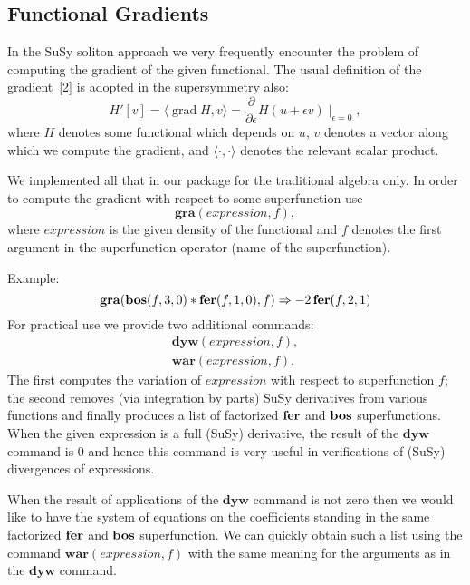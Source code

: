 {\subsection{Functional Gradients}

In the SuSy soliton approach we very frequently encounter the problem
of computing the gradient of the given functional.  The usual
definition of the gradient~\hyperref[susy2-bib]{[2]} is adopted in the
supersymmetry also:
\begin{equation*}
  H'[v] = \langle \operatorname{grad} H, v \rangle =
  \frac{\partial}{\partial\epsilon} H(u+\epsilon v) \mid_{\epsilon=0},
\end{equation*}
where $H$ denotes some functional which depends on $u$, $v$ denotes a
vector along which we compute the gradient, and
$\langle\cdot,\cdot\rangle$ denotes the relevant scalar product.

We implemented all that in our package for the traditional algebra
only.  In order to compute the gradient with respect to some
superfunction use
\begin{equation*}
  \mathbf{gra}(\mathit{expression},f),
\end{equation*}
where $\mathit{expression}$ is the given density of the functional and
$f$ denotes the first argument in the superfunction operator (name of
the superfunction).

Example:
\begin{equation*}
  \mathbf{gra}(\mathbf{bos}(f,3,0)*\mathbf{fer}(f,1,0),f) \Rightarrow -2\,\mathbf{fer}(f,2,1)
\end{equation*}
For practical use we provide two additional commands:
\begin{gather*}
  \mathbf{dyw}(\mathit{expression},f), \\
  \mathbf{war}(\mathit{expression},f).
\end{gather*}
The first computes the variation of $\mathit{expression}$ with respect
to superfunction $f$; the second removes (via integration by parts)
SuSy derivatives from various functions and finally produces a list of
factorized $\mathbf{fer}$ and $\mathbf{bos}$ superfunctions.  When the given
expression is a full (SuSy) derivative, the result of the
$\mathbf{dyw}$ command is 0 and hence this command is very useful in
verifications of (SuSy) divergences of expressions.

When the result of applications of the $\mathbf{dyw}$ command is not
zero then we would like to have the system of equations on the
coefficients standing in the same factorized $\mathbf{fer}$ and $\mathbf{bos}$
superfunction.  We can quickly obtain such a list using the command
$\mathbf{war}(\mathit{expression},f)$ with the same meaning for the
arguments as in the $\mathbf{dyw}$ command.

}
